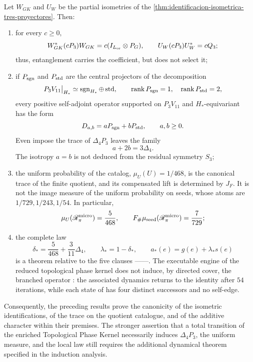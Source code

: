 \begin{theorem}
\label{p3-20260826:thm:alcance-induccion-accion}
Let \(W_{GK}\) and \(U_W\) be the partial isometries of the
\cref{thm:identificacion-isometrica-tres-proyectores}. Then:
\begin{enumerate}
  \item for every \(c\geq0\),
  \[
   W_{GK}^{*}(cP_3)W_{GK}
   =c(I_{L_{\rm or}}\otimes P_G),
   \qquad
   U_W(cP_3)U_W^{*}=cQ_3;
  \]
  thus, entanglement carries the coefficient, but does not select it;
  \item if \(P_{\rm sgn}\) and \(P_{\rm std}\) are the central projectors
  of the decomposition
  \[
   P_3V_{11}\big|_{H_*}
   \simeq \operatorname{sgn}_{H_*}\oplus\operatorname{std},
   \qquad
   \operatorname{rank}P_{\rm sgn}=1,
   \quad
   \operatorname{rank}P_{\rm std}=2,
  \]
  every positive self-adjoint operator supported on \(P_3V_{11}\) and
  \(H_*\)-equivariant has the form
  \[
   D_{a,b}=aP_{\rm sgn}+bP_{\rm std},
   \qquad a,b\geq0.
  \]
  Even impose the trace of \(\Delta_4P_3\) leaves the family
  \[
   a+2b=3\Delta_4.
  \]
  The isotropy \(a=b\) is not deduced from the residual symmetry \(S_3\);
  \item the uniform probability of the catalog,
  \(\mu_U(U)=1/468\), is the canonical trace of the finite quotient, and its
  compensated lift is determined by \(J_F\). It is not the
  image measure of the uniform probability on seeds, whose atoms are
  \(1/729,1/243,1/54\). In particular,
  \[
   \mu_U(\mathscr R_\pi^{\rm micro})=\frac5{468},
   \qquad
   F_\#\mu_{\rm seed}(\mathscr R_\pi^{\rm micro})=\frac7{729};
  \]
  \item the complete law
  \[
   \delta_*=\frac5{468}+\frac3{11}\Delta_4,
   \qquad
   \lambda_*=1-\delta_*,
   \qquad
   a_*(e)=g(e)+\lambda_*s(e)
  \]
  is a theorem relative to the five clauses \HTr--\HAdd--\HDef--\HRes--\HLoc. The
  executable engine of the reduced topological phase kernel does not induce, by directed cover, the branched operator
  \Gtr: the associated dynamics returns to the identity after \(54\) iterations,
  while each state of
  \Gtr has four distinct successors and no self-edge.
\end{enumerate}
Consequently, the preceding results prove the canonicity of the isometric
identifications, of the trace on the quotient catalogue, and of the additive character
within their premises. The stronger assertion that a total transition
of the enriched Topological Phase Kernel necessarily induces \(\Delta_4P_3\), the uniform measure, and the
local law still requires the additional dynamical theorem specified in the
induction analysis.
\end{theorem}

